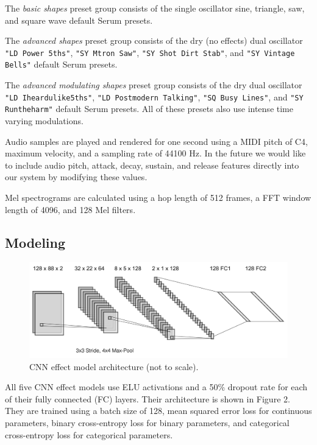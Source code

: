 \documentclass{article}
\begin{document}
The \emph{basic shapes} preset group consists of the single oscillator sine, triangle, saw, and square wave default Serum presets.

The \emph{advanced shapes} preset group consists of the dry (no effects) dual oscillator \texttt{"LD Power 5ths"}, \texttt{"SY Mtron Saw"}, \texttt{"SY Shot Dirt Stab"}, and \texttt{"SY Vintage Bells"} default Serum presets.

The \emph{advanced modulating shapes} preset group consists of the dry dual oscillator \texttt{"LD Iheardulike5ths"}, \texttt{"LD Postmodern Talking"}, \texttt{"SQ Busy Lines"}, and \texttt{"SY Runtheharm"} default Serum presets. All of these presets also use intense time varying modulations.

Audio samples are played and rendered for one second using a MIDI pitch of C4, maximum velocity, and a sampling rate of 44100 Hz. In the future we would like to include audio pitch, attack, decay, sustain, and release features directly into our system by modifying these values.

Mel spectrograms are calculated using a hop length of 512 frames, a FFT window length of 4096, and 128 Mel filters.

\subsection{Modeling}

\begin{figure}[ht]
  \centering
  \includegraphics[width=0.85\linewidth]{images/cnn_2x.png}
  \caption{CNN effect model architecture (not to scale).}
\end{figure}

All five CNN effect models use ELU activations and a 50\% dropout rate for each of their fully connected (FC) layers. Their architecture is shown in Figure 2. They are trained using a batch size of 128, mean squared error loss for continuous parameters, binary cross-entropy loss for binary parameters, and categorical cross-entropy loss for categorical parameters. 
\end{document}
